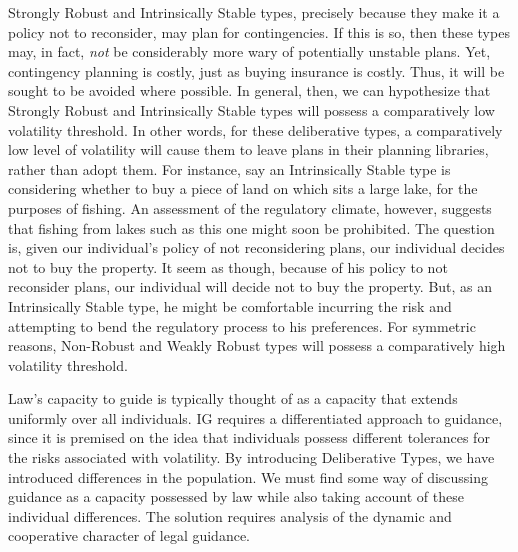 Strongly Robust and Intrinsically Stable types, precisely because they
make it a policy not to reconsider, may plan for contingencies. If this
is so, then these types may, in fact, \emph{not} be considerably more
wary of potentially unstable plans. Yet, contingency planning is costly,
just as buying insurance is costly. Thus, it will be sought to be
avoided where possible. In general, then, we can hypothesize that
Strongly Robust and Intrinsically Stable types will possess a
comparatively low volatility threshold. In other words, for these
deliberative types, a comparatively low level of volatility will cause
them to leave plans in their planning libraries, rather than adopt them.
For instance, say an Intrinsically Stable type is considering whether to
buy a piece of land on which sits a large lake, for the purposes of
fishing. An assessment of the regulatory climate, however, suggests that
fishing from lakes such as this one might soon be prohibited. The
question is, given our individual's policy of not reconsidering plans,
our individual decides not to buy the property. It seem as though,
because of his policy to not reconsider plans, our individual will
decide not to buy the property. But, as an Intrinsically Stable type, he
might be comfortable incurring the risk and attempting to bend the
regulatory process to his preferences. For symmetric reasons, Non-Robust
and Weakly Robust types will possess a comparatively high volatility
threshold.

Law's capacity to guide is typically thought of as a capacity that
extends uniformly over all individuals. IG requires a differentiated
approach to guidance, since it is premised on the idea that individuals
possess different tolerances for the risks associated with volatility.
By introducing Deliberative Types, we have introduced differences in the
population. We must find some way of discussing guidance as a capacity
possessed by law while also taking account of these individual
differences. The solution requires analysis of the dynamic and
cooperative character of legal guidance.

